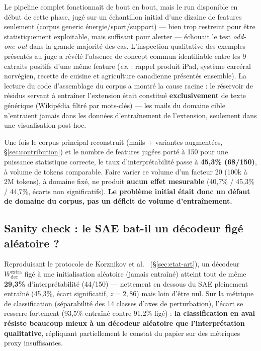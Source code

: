 \documentclass[11pt]{article}
\begin{document}
Le pipeline complet fonctionnait de bout en bout, mais le run disponible en
début de cette phase, jugé sur un échantillon initial d'une dizaine de
features seulement (corpus generic énergie/sport/support) --- bien trop
restreint pour être statistiquement exploitable, mais suffisant pour alerter
--- échouait le test \emph{odd-one-out} dans la grande majorité des cas.
L'inspection qualitative des exemples présentés au juge a révélé l'absence de
concept commun identifiable entre les 9 extraits
positifs d'une même feature (\emph{ex.} : rappel produit iPad, système
carcéral norvégien, recette de cuisine et agriculture canadienne présentés
ensemble). La lecture du code d'assemblage du corpus a montré la cause
racine : le réservoir de résidus servant à entraîner l'extension était
constitué \textbf{exclusivement} de texte générique (Wikipédia filtré par
mots-clés) --- les mails du domaine cible n'entraient jamais dans les données
d'entraînement de l'extension, seulement dans une visualisation post-hoc.

\begin{resultbox}
Une fois le corpus principal reconstruit (mails + variantes augmentées,
\S\ref{sec:contribution}) et le nombre de features jugées porté à 150 pour une
puissance statistique correcte, le taux d'interprétabilité passe à
\textbf{45,3\% (68/150)}, à volume de
tokens comparable. Faire varier ce volume d'un facteur 20 (100k à 2M tokens),
à domaine fixé, ne produit \textbf{aucun effet mesurable} (40,7\% / 45,3\% /
44,7\%, écarts non significatifs). \textbf{Le problème initial était donc un
défaut de domaine du corpus, pas un déficit de volume d'entraînement.}
\end{resultbox}

\subsection{Sanity check : le SAE bat-il un décodeur figé aléatoire ?}
\label{subsec:sanity-check-resultats}

Reproduisant le protocole de Korznikov et al.~\cite{korznikov2025sanitychecks}
(\S\ref{sec:etat-art}), un décodeur $W_\text{dec}^\text{extra}$ figé à une
initialisation aléatoire (jamais entraîné) atteint tout de même
\textbf{29,3\%} d'interprétabilité (44/150) --- nettement en dessous du SAE
pleinement entraîné (45,3\%, écart significatif, $z=2,86$) mais loin d'être
nul. Sur la métrique de classification (séparabilité des 14 classes d'axes
de perturbation), l'écart se resserre fortement (93,5\% entraîné contre
91,2\% figé) : \textbf{la classification en aval résiste beaucoup mieux à un
décodeur aléatoire que l'interprétation qualitative}, répliquant partiellement
le constat du papier sur des métriques proxy insuffisantes.
\end{document}
